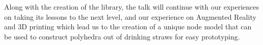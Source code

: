 \documentclass[a4paper,10pt]{article}
\begin{document}
Along with the creation of the library, the talk will continue with our experiences on taking its lessons to the next level, and our experience on Augmented Reality and 3D printing which lead us to the creation of a unique node model that can be used to construct polyhedra out of drinking straws for easy prototyping.  







\begin{thebibliography}{10}
\end{thebibliography}









\end{document}
